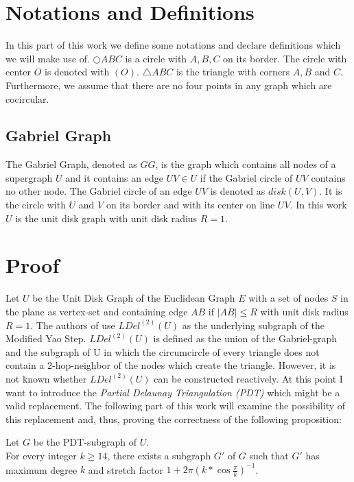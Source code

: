 \section{Notations and Definitions}
In this part of this work we define some notations and declare definitions which we will make use of.
$\bigcirc{ABC} $ is a circle with $A, B, C $ on its border.
The circle with center $O $ is denoted with $(O) $.
$\triangle{ABC} $ is the triangle with corners $A,B $ and $C $.
Furthermore, we assume that there are no four points in any graph which are cocircular.

\subsection{Gabriel Graph}
The Gabriel Graph, denoted as $GG $, is the graph which contains all nodes of a supergraph $U $ and it contains an edge $UV \in U $ if the Gabriel circle of $UV $ contains no other node.
The Gabriel circle of an edge $UV $ is denoted as $disk(U, V) $.
It is the circle with $U $ and $V $ on its border and with its center on line $UV $. 
In this work $U $ is the unit disk graph with unit disk radius $R = 1 $.

\section{Proof}
Let $U $ be the Unit Disk Graph of the Euclidean Graph $E $ with a set of nodes $S $ in the plane as vertex-set and containing edge $AB $ if $|AB| \leq R $ with unit disk radius $R=1 $.
The authors of \cite{kanj} use $LDel^{(2)}(U) $ as the underlying subgraph of the Modified Yao Step.
$LDel^{(2)}(U) $ is defined as the union of the Gabriel-graph and the subgraph of U in which the circumcircle of every triangle does not contain a 2-hop-neighbor of the nodes which create the triangle.
However, it is not known whether $LDel^{(2)}(U) $ can be constructed reactively.
At this point I want to introduce the \emph{Partial Delaunay Triangulation (PDT)} \cite{pdt} which might be a valid replacement.
The following part of this work will examine the possibility of this replacement and, thus, proving the correctness of the following proposition:

\begin{prop}
\label{mastertheorem}
Let $G $ be the PDT-subgraph of $U $.\\
For every integer $k \geq 14 $, there exists a subgraph $G' $ of $G $ such that $G' $ has maximum degree $k $ and stretch factor $1+2\pi (k*\cos{\frac{\pi}{k}})^{-1} $.
\end{prop} 


